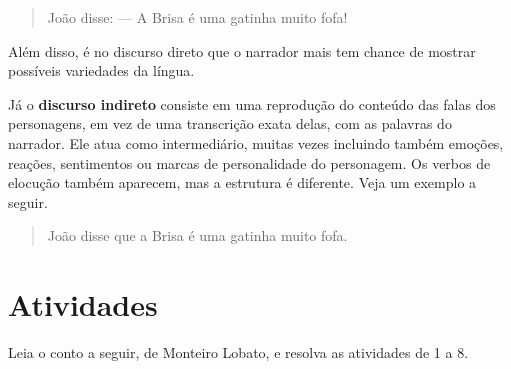 {\begin{quote}
João disse:
--- A Brisa é uma gatinha muito fofa!
\end{quote}

Além disso, é no discurso direto que o narrador mais tem chance de mostrar
possíveis variedades da língua.

Já o \textbf{discurso indireto} consiste em uma reprodução do conteúdo das falas dos
personagens, em vez de uma transcrição exata delas, com as palavras do
narrador. Ele atua como intermediário, muitas vezes incluindo também
emoções, reações, sentimentos ou marcas de personalidade do personagem.
Os verbos de elocução também aparecem, mas a estrutura é diferente.
Veja um exemplo a seguir.

\begin{quote}
João disse que a Brisa é uma gatinha muito fofa.
\end{quote}
}


\section{Atividades}

Leia o conto a seguir, de Monteiro Lobato, e resolva as atividades de 1 a 8.




